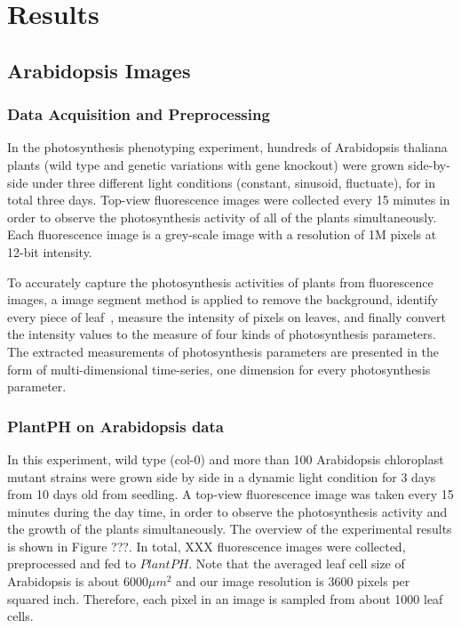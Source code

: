 \documentclass{bioinfo}
\begin{document}
\section{Results}

\subsection{Arabidopsis Images}

\subsubsection{Data Acquisition and Preprocessing}

In the photosynthesis phenotyping experiment, hundreds of Arabidopsis thaliana plants (wild type and genetic variations with gene knockout) were grown side-by-side under three different light conditions (constant, sinusoid, fluctuate), for in total three days.
%
Top-view fluorescence images were collected every 15 minutes in order to observe the photosynthesis activity of all of the plants simultaneously. Each fluorescence image is a grey-scale image with a resolution of 1M pixels at 12-bit intensity.

To accurately capture the photosynthesis activities of plants from fluorescence images, a image segment method is applied to remove the background, identify every piece of leaf~\citep{yin2014}, measure the intensity of pixels on leaves, and finally convert the intensity values to the measure of four kinds of photosynthesis parameters.
%
The extracted measurements of photosynthesis parameters are presented in the form of multi-dimensional time-series, one dimension for every photosynthesis parameter.
%

\subsubsection{PlantPH on Arabidopsis data}

In this experiment, wild type (col-0) and more than 100 Arabidopsis chloroplast mutant strains were grown side by side in a dynamic light condition for 3 days from 10 days old from seedling. A top-view fluorescence image was taken every 15 minutes during the day time, in order to observe the photosynthesis activity and the growth of the plants simultaneously. The overview of the experimental results is shown in Figure ???. In total, XXX fluorescence images were collected, preprocessed and fed to $PlantPH$. Note that the averaged leaf cell size of Arabidopsis is about $6000 \mu m^2$ \citep{gegas2014endopolyploidy} and our image resolution is 3600 pixels per squared inch. Therefore, each pixel in an image is sampled from about 1000 leaf cells.
\end{document}
